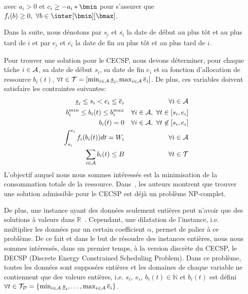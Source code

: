 \noindent
avec $a_i>0$ et $c_i \geq -a_i*\bmin $ pour
s'assurer que $f_i(b) \geq 0,\ \forall b \in \inter[\bmin][\bmax]$.

Dans la suite, nous dénotons par $\underline{s_i}$ et $\overline{s_i}$
la date de début au plus tôt et au plus tard de $i$ et par
$\underline{e_i}$ et $\overline{e_i}$ la date de fin au plus tôt et au
plus tard de $i$.

Pour trouver une solution pour le CECSP, nous devons déterminer, pour
chaque tâche $i \in {\cal A}$, sa date de début $s_i$, sa date de fin
$e_i$ et sa fonction d'allocation de ressource $b_i(t)$, $\forall t
\in {\cal T}=[\min_{i\in{\cal A}} \underline{s}_i, \max_{i\in {\cal
    A}} \overline{e}_i]$. De plus, ces variables doivent satisfaire
les contraintes suivantes:
{\scriptsize
\begin{eqnarray} 
  \underline{s}_i\le s_i < e_i \le \overline{e}_i & & \forall i \in
{\cal A} \label {tw_CECSP}\\
  b_i^{min} \le b_i(t) \le b_i^{max} & & \forall i \in {\cal A},\
\forall t \in [s_i,e_i] \label {bminmax_CECSP}\\
  b_i(t)=0 & & \forall i \in {\cal A},\ \forall t \not\in
[s_i,e_i] \label {b0_CECSP}\\
  \int_{s_i}^{e_i} f_i(b_i(t))dt =W_i & & \forall i \in {\cal
A} \label{nrj_CECSP}\\
  \sum_{i \in {\cal A}} b_i(t) \le B & & \forall t \in {\cal
T} \label{res_CECSP}
\end{eqnarray}}
L'objectif auquel nous nous sommes intéressés est la minimisation de
la consommation totale de la ressource. Dans~\cite{Nattaf2015}, les
auteurs montrent que trouver une solution admissible pour le CECSP est
déjà un problème NP-complet. 

De plus, une instance ayant des données seulement entières peut
n'avoir que des solutions à valeurs dans
$\mathbb{R}$~\cite{Nattaf2015}. Cependant, une dilatation de
l'instance, i.e. multiplier les données par un certain coefficient
$\alpha$, permet de palier à ce problème. 
De ce fait et dans le but de résoudre des instances entières, nous
nous sommes intéressés, dans un premier temps, à la version discrète
du CECSP, le DECSP (Discrete Energy Constrained Scheduling
Problem). Dans ce problème, toutes les données sont supposées entières
et les domaines de chaque variable ne contiennent
que des valeurs entières, i.e. $s_i,\ e_i,\ b_i(t) \in \mathbb{N}$ et
$b_i(t)$ est défini $\forall t \in {\cal T}_{\cal D}=\{\min_{i\in{\cal
A}} \underline{s}_i,\dots, \max_{i\in {\cal A}} \overline{e}_i\}$. 

